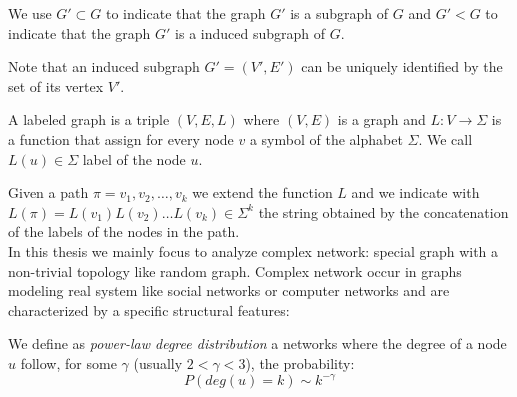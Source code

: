 We use $G' \subset G$ to indicate that the graph $G'$ is a subgraph of $G$ and $G' < G$ to indicate that the graph $G'$ is a induced subgraph of $G$.

Note that an induced subgraph $G' = (V', E')$ can be uniquely identified by the set of its vertex $V'$.\\

\begin{definizione}\label{def:labeledgraph}
	A labeled graph is a triple $(V,E,L)$ where $(V,E)$ is a graph and $L : V \rightarrow \Sigma$
	is a function that assign for every node $v$ a symbol of the alphabet $\Sigma$. We call $L(u) \in \Sigma$ label of the node $u$.
\end{definizione}

Given a path $\pi = v_{1}, v_{2}, \ldots, v_{k}$ we extend the function $L$ and we indicate with $L(\pi) = L(v_{1}) L(v_{2}) \ldots L(v_{k}) \in \Sigma^{k}$ the string obtained by the concatenation of the labels of the nodes in the path.\\

In this thesis we mainly focus to analyze complex network: special graph with a non-trivial topology like random graph. Complex network occur in graphs modeling real system like social networks or computer networks and are characterized by a specific structural features:

\begin{definizione}\label{def:power-law-graph}
	We define as \textit{power-law degree distribution} a networks where the degree of a node $u$ follow, for some $\gamma$ (usually $2 < \gamma < 3$), the probability:
	\begin{equation}
		P(deg(u) = k) \sim k^{-\gamma}  
	\end{equation}
\end{definizione}

